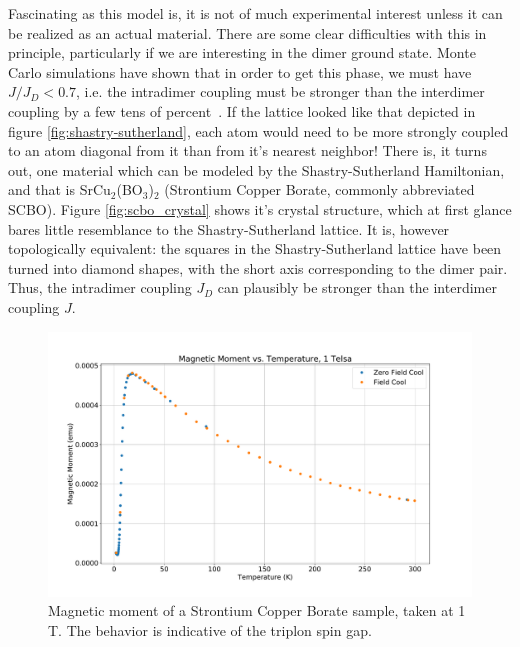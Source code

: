 \documentclass{thesis-umich}
\begin{document}
Fascinating as this model is, it is not of much experimental interest unless it can be realized as an actual material. There are some clear difficulties with this in principle, particularly if we are interesting in the dimer ground state. Monte Carlo simulations have shown that in order to get this phase, we must have $J/J_D < 0.7$, i.e. the intradimer coupling must be stronger than the interdimer coupling by a few tens of percent~\cite{Miyahara1999}. If the lattice looked like that depicted in figure \ref{fig:shastry-sutherland}, each atom would need to be more strongly coupled to an atom diagonal from it than from it's nearest neighbor! There is, it turns out, one material which can be modeled by the Shastry-Sutherland Hamiltonian, and that is SrCu$_2$(BO$_3$)$_2$ (Strontium Copper Borate, commonly abbreviated SCBO). Figure \ref{fig:scbo_crystal} shows it's crystal structure, which at first glance bares little resemblance to the Shastry-Sutherland lattice. It is, however topologically equivalent: the squares in the Shastry-Sutherland lattice have been turned into diamond shapes, with the short axis corresponding to the dimer pair. Thus, the intradimer coupling $J_D$ can plausibly be stronger than the interdimer coupling $J$. 

\begin{figure}
	\caption[Magnetic moment of a SCBO sample]{Magnetic moment of a Strontium Copper Borate sample, taken at 1 T. The behavior is indicative of the triplon spin gap.}
	\label{fig:scbo_magmom}
	\includegraphics[width=\columnwidth]{figures/SCBO_m_vs_t.pdf}
\end{figure}
\end{document}
